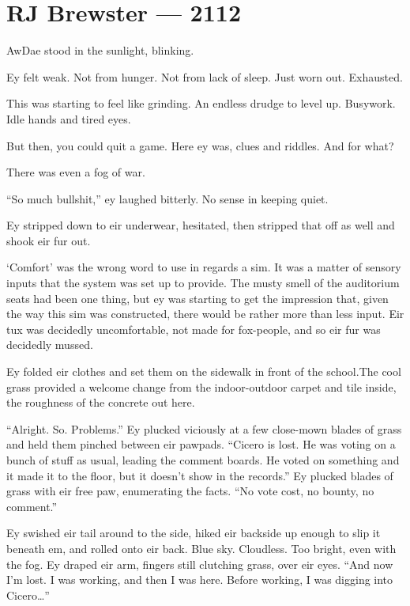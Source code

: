 \hypertarget{rj-brewster-2112}{%
\chapter*{RJ Brewster — 2112}\label{rj-brewster-2112}}

AwDae stood in the sunlight, blinking.

Ey felt weak. Not from hunger. Not from lack of sleep. Just worn out. Exhausted.

This was starting to feel like grinding. An endless drudge to level up. Busywork. Idle hands and tired eyes.

But then, you could quit a game. Here ey was, clues and riddles. And for what?

There was even a fog of war.

``So much bullshit,'' ey laughed bitterly. No sense in keeping quiet.

Ey stripped down to eir underwear, hesitated, then stripped that off as well and shook eir fur out.

`Comfort' was the wrong word to use in regards a sim. It was a matter of sensory inputs that the system was set up to provide. The musty smell of the auditorium seats had been one thing, but ey was starting to get the impression that, given the way this sim was constructed, there would be rather more than less input. Eir tux was decidedly uncomfortable, not made for fox-people, and so eir fur was decidedly mussed.

Ey folded eir clothes and set them on the sidewalk in front of the school.The cool grass provided a welcome change from the indoor-outdoor carpet and tile inside, the roughness of the concrete out here.

``Alright. So. Problems.'' Ey plucked viciously at a few close-mown blades of grass and held them pinched between eir pawpads. ``Cicero is lost. He was voting on a bunch of stuff as usual, leading the comment boards. He voted on something and it made it to the floor, but it doesn't show in the records.'' Ey plucked blades of grass with eir free paw, enumerating the facts. ``No vote cost, no bounty, no comment.''

Ey swished eir tail around to the side, hiked eir backside up enough to slip it beneath em, and rolled onto eir back. Blue sky. Cloudless. Too bright, even with the fog. Ey draped eir arm, fingers still clutching grass, over eir eyes. ``And now I'm lost. I was working, and then I was here. Before working, I was digging into Cicero\ldots{}''

